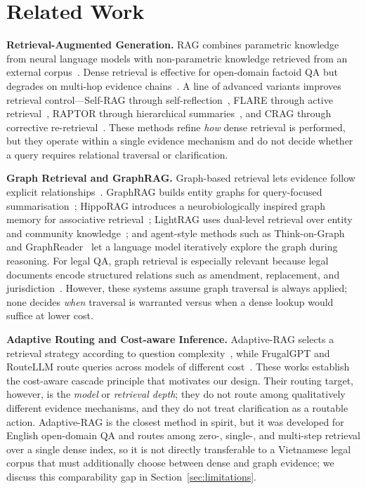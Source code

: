 \documentclass[pdflatex,sn-mathphys-num]{sn-jnl}
\begin{document}
\section{Related Work}\label{sec:related_work}

\noindent\textbf{Retrieval-Augmented Generation.}
RAG combines parametric knowledge from neural language models with
non-parametric knowledge retrieved from an external
corpus~\cite{lewis2020rag,guu2020realm}. Dense retrieval is effective for
open-domain factoid QA but degrades on multi-hop evidence
chains~\cite{karpukhin2020dpr,trivedi2023interleaving}. A line of advanced
variants improves retrieval control---Self-RAG through
self-reflection~\cite{asai2023selfrag}, FLARE through active
retrieval~\cite{jiang2023flare}, RAPTOR through hierarchical
summaries~\cite{sarthi2024raptor}, and CRAG through corrective
re-retrieval~\cite{yan2024corrective}. These methods refine \emph{how} dense
retrieval is performed, but they operate within a single evidence mechanism
and do not decide whether a query requires relational traversal or
clarification.

\noindent\textbf{Graph Retrieval and GraphRAG.}
Graph-based retrieval lets evidence follow explicit
relationships~\cite{sun2019pullnet,wang2024kgp}. GraphRAG builds entity
graphs for query-focused summarisation~\cite{edge2024graphrag}; HippoRAG
introduces a neurobiologically inspired graph memory for associative
retrieval~\cite{gutierrez2024hipporag}; LightRAG uses dual-level retrieval
over entity and community knowledge~\cite{he2024lightrag}; and
agent-style methods such as Think-on-Graph~\cite{sun2024thinkongraph} and
GraphReader~\cite{li2024graphreader} let a language model iteratively explore
the graph during reasoning. For legal QA, graph retrieval is especially
relevant because legal documents encode structured relations such as
amendment, replacement, and jurisdiction~\cite{sovrano2020legalkg}. However,
these systems assume graph traversal is always applied; none decides
\emph{when} traversal is warranted versus when a dense lookup would suffice at
lower cost.

\noindent\textbf{Adaptive Routing and Cost-aware Inference.}
Adaptive-RAG selects a retrieval strategy according to question
complexity~\cite{jeong2024adaptive}, while FrugalGPT and RouteLLM route
queries across models of different
cost~\cite{chen2023frugalgpt,ong2024routellm}. These works establish the
cost-aware cascade principle that motivates our design. Their routing target,
however, is the \emph{model} or \emph{retrieval depth}; they do not route
among qualitatively different evidence mechanisms, and they do not treat
clarification as a routable action. Adaptive-RAG is the closest method in
spirit, but it was developed for English open-domain QA and routes among
zero-, single-, and multi-step retrieval over a single dense index, so it is
not directly transferable to a Vietnamese legal corpus that must additionally
choose between dense and graph evidence; we discuss this comparability gap in
Section~\ref{sec:limitations}.
\end{document}

